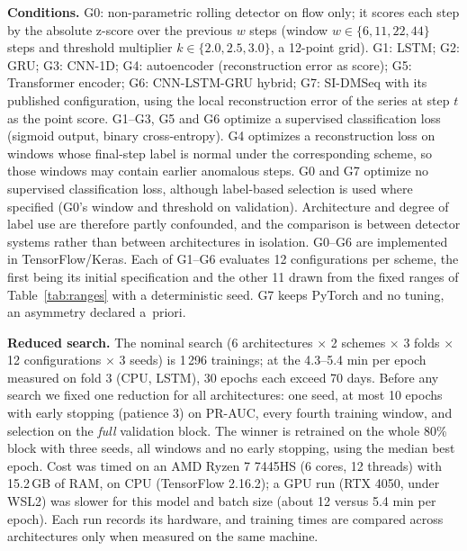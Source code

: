 \documentclass[conference]{IEEEtran}
\begin{document}
\textbf{Conditions.} G0: non-parametric rolling detector on flow only; it
scores each step by the absolute z-score over the previous $w$ steps (window
$w\in\{6,11,22,44\}$ steps and threshold multiplier $k\in\{2.0,2.5,3.0\}$,
a 12-point grid). G1: LSTM; G2:
GRU; G3: CNN-1D; G4: autoencoder (reconstruction error as score); G5:
Transformer encoder; G6: CNN-LSTM-GRU hybrid; G7: SI-DMSeq
\cite{nouri2025sidmseq} with its published configuration, using the local
reconstruction error of the series at step $t$ as the point score. G1--G3, G5
and G6 optimize a supervised classification loss (sigmoid output, binary
cross-entropy). G4 optimizes a reconstruction loss on windows whose final-step
label is normal under the corresponding scheme, so those windows may contain
earlier anomalous steps. G0 and G7 optimize no supervised classification
loss, although label-based selection is used where specified (G0's window and
threshold on validation). Architecture and degree of label use are therefore
partly confounded, and the comparison is between detector systems rather
than between architectures in isolation. G0--G6 are implemented in
TensorFlow/Keras. Each of G1--G6 evaluates 12
configurations per scheme, the first being its initial specification and the
other 11 drawn from the fixed ranges of Table~\ref{tab:ranges} with a
deterministic seed. G7 keeps PyTorch
and no tuning, an asymmetry declared a~priori.

\textbf{Reduced search.} The nominal search (6 architectures $\times$ 2
schemes $\times$ 3 folds $\times$ 12 configurations $\times$ 3 seeds) is 1\,296
trainings; at the 4.3--5.4 min per epoch measured on fold 3 (CPU, LSTM), 30
epochs each exceed 70 days. Before any search we fixed one reduction for all
architectures: one seed, at most 10 epochs with early stopping (patience 3)
on PR-AUC, every fourth training window, and selection on the \emph{full}
validation block. The winner is retrained on the whole 80\% block with three
seeds, all windows and no early stopping, using the median best epoch. Cost was timed on an AMD Ryzen 7 7445HS
(6 cores, 12 threads) with 15.2\,GB of RAM, on CPU (TensorFlow 2.16.2); a
GPU run (RTX 4050, under WSL2) was slower for this model and batch size
(about 12 versus 5.4 min per epoch). Each run records its hardware, and
training times are compared across architectures only when measured on the
same machine.
\end{document}
